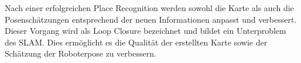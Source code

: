 Nach einer erfolgreichen Place Recognition werden sowohl die Karte als auch die Posenschätzungen entsprechend der neuen Informationen anpasst und  verbessert. Dieser Vorgang wird als Loop Closure bezeichnet und bildet ein Unterproblem des SLAM. Dies ermöglicht es die Qualität der erstellten Karte sowie der Schätzung der Roboterpose zu verbessern. 





%
%

